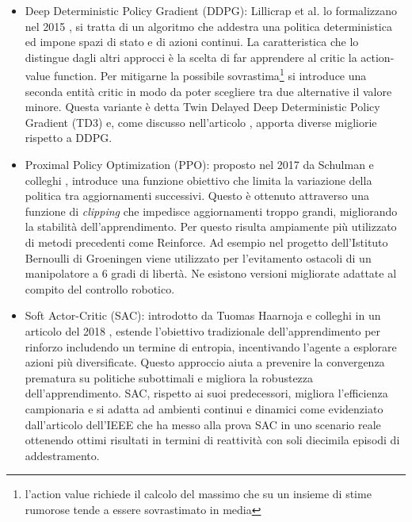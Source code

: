 \begin{itemize}
    \item Deep Deterministic Policy Gradient (DDPG): Lillicrap et al. lo formalizzano nel 2015 \cite{lillicrap2015continuous}, si tratta di un algoritmo che addestra una politica deterministica ed impone spazi di stato e di azioni continui. La caratteristica che lo distingue dagli altri approcci è la scelta di far apprendere al critic la action-value function. Per mitigarne la possibile sovrastima\footnote{l'action value richiede il calcolo del massimo che su un insieme di stime rumorose tende a essere sovrastimato in media} si introduce una seconda entità critic in modo da poter scegliere tra due alternative il valore minore. Questa variante è detta Twin Delayed Deep Deterministic Policy Gradient (TD3) e, come discusso nell'articolo \cite{li2024path}, apporta diverse migliorie rispetto a DDPG.
    \item Proximal Policy Optimization (PPO): proposto nel 2017 da Schulman e colleghi \cite{schulman2017proximal}, introduce una funzione obiettivo che limita la variazione della politica tra aggiornamenti successivi. Questo è ottenuto attraverso una funzione di \textit{clipping} che impedisce aggiornamenti troppo grandi, migliorando la stabilità dell'apprendimento. Per questo risulta ampiamente più utilizzato di metodi precedenti come Reinforce. Ad esempio nel progetto dell'Istituto Bernoulli di Groeningen \cite{wang2022ippo} viene utilizzato per l'evitamento ostacoli di un manipolatore a 6 gradi di libertà. Ne esistono versioni migliorate adattate al compito del controllo robotico.
    \item Soft Actor-Critic (SAC): introdotto da Tuomas Haarnoja e colleghi in un articolo del 2018 \cite{haarnoja2018soft}, estende l'obiettivo tradizionale dell'apprendimento per rinforzo includendo un termine di entropia, incentivando l'agente a esplorare azioni più diversificate. Questo approccio aiuta a prevenire la convergenza prematura su politiche subottimali e migliora la robustezza dell'apprendimento. SAC, rispetto ai suoi predecessori, migliora l'efficienza campionaria e si adatta ad ambienti continui e dinamici come evidenziato dall'articolo dell'IEEE \cite{nakhleh2023sacplanner} che ha messo alla prova SAC in uno scenario reale ottenendo ottimi risultati in termini di reattività con soli diecimila episodi di addestramento.
\end{itemize} 

